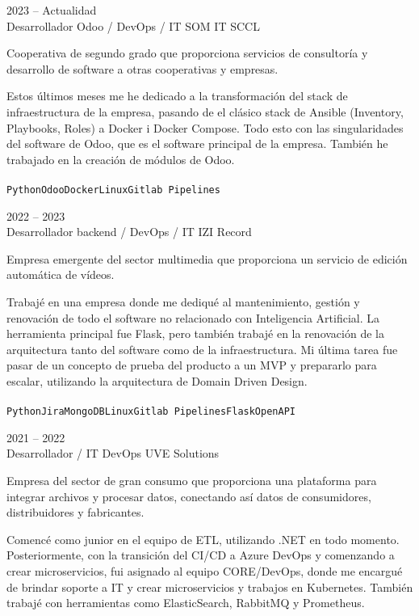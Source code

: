 \documentclass[9pt]{developercv} %
\begin{document}
\begin{entrylist}

	\entry
		{2023 -- Actualidad\\}
		{Desarrollador Odoo / DevOps / IT}
		{SOM IT SCCL}
		{Cooperativa de segundo grado que proporciona servicios de consultoría y desarrollo de software a otras cooperativas y empresas.

		Estos últimos meses me he dedicado a la transformación del stack de infraestructura de la empresa, pasando de el clásico stack de Ansible (Inventory, Playbooks, Roles) a Docker i Docker Compose. Todo esto con las singularidades del software de Odoo, que es el software principal de la empresa. También he trabajado en la creación de módulos de Odoo. \\
		\\ \texttt{Python}\slashsep\texttt{Odoo}\slashsep\texttt{Docker}\slashsep\texttt{Linux}\slashsep\texttt{Gitlab Pipelines}
		}
	\entry
		{2022 -- 2023\\}
		{Desarrollador backend / DevOps / IT}
		{IZI Record}
		{Empresa emergente del sector multimedia que proporciona un servicio de edición automática de vídeos.

		Trabajé en una empresa donde me dediqué al mantenimiento, gestión y renovación de todo el software no relacionado con Inteligencia Artificial. La herramienta principal fue Flask, pero también trabajé en la renovación de la arquitectura tanto del software como de la infraestructura. Mi última tarea fue pasar de un concepto de prueba del producto a un MVP y prepararlo para escalar, utilizando la arquitectura de Domain Driven Design. \\

		\\ \texttt{Python}\slashsep\texttt{Jira}\slashsep\texttt{MongoDB}\slashsep\texttt{Linux}\slashsep\texttt{Gitlab Pipelines}\slashsep\texttt{Flask}\slashsep\texttt{OpenAPI}
		}
	\entry
		{2021 -- 2022\\}
		{Desarrollador / IT DevOps}
		{UVE Solutions}
		{Empresa del sector de gran consumo que proporciona una plataforma para integrar archivos y procesar datos, conectando así datos de consumidores, distribuidores y fabricantes.

		Comencé como junior en el equipo de ETL, utilizando .NET en todo momento. Posteriormente, con la transición del CI/CD a Azure DevOps y comenzando a crear microservicios, fui asignado al equipo CORE/DevOps, donde me encargué de brindar soporte a IT y crear microservicios y trabajos en Kubernetes. También trabajé con herramientas como ElasticSearch, RabbitMQ y Prometheus. \\
		
}
\end{entrylist}
\end{document}
